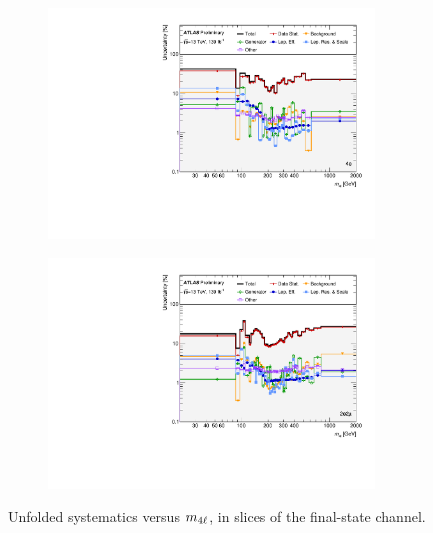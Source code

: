 \begin{figure}[hp]
    \begin{subfigure}{.49\textwidth}\centering\includegraphics[width = 0.95\textwidth]{Figures/m4l/Systematics/Unfolded/UnfoldedSys_M4lvChannel_Stack_Paper1.pdf}\end{subfigure}
    \begin{subfigure}{.49\textwidth}\centering\includegraphics[width = 0.95\textwidth]{Figures/m4l/Systematics/Unfolded/UnfoldedSys_M4lvChannel_Stack_Paper2.pdf}\end{subfigure}
    \caption{Unfolded systematics versus $m_{4\ell}$, in slices of the final-state channel.}
\end{figure}

